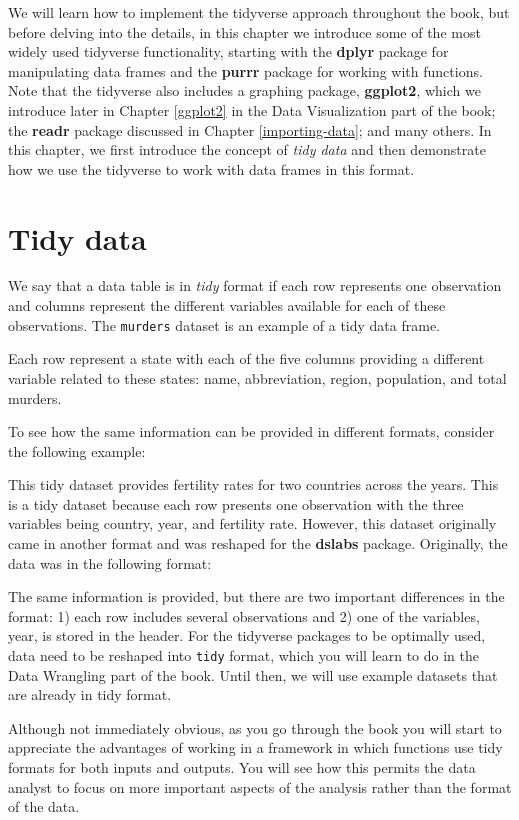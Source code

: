 \documentclass[
]{krantz}
\begin{document}
We will learn how to implement the tidyverse approach throughout the book, but before delving into the details, in this chapter we introduce some of the most widely used tidyverse functionality, starting with the \textbf{dplyr} package for manipulating data frames and the \textbf{purrr} package for working with functions. Note that the tidyverse also includes a graphing package, \textbf{ggplot2}, which we introduce later in Chapter \ref{ggplot2} in the Data Visualization part of the book; the \textbf{readr} package discussed in Chapter \ref{importing-data}; and many others. In this chapter, we first introduce the concept of \emph{tidy data} and then demonstrate how we use the tidyverse to work with data frames in this format.

\hypertarget{tidy-data}{%
\section{Tidy data}\label{tidy-data}}

We say that a data table is in \emph{tidy} format if each row represents one observation and columns represent the different variables available for each of these observations. The \texttt{murders} dataset is an example of a tidy data frame.

Each row represent a state with each of the five columns providing a different variable related to these states: name, abbreviation, region, population, and total murders.

To see how the same information can be provided in different formats, consider the following example:

This tidy dataset provides fertility rates for two countries across the years. This is a tidy dataset because each row presents one observation with the three variables being country, year, and fertility rate. However, this dataset originally came in another format and was reshaped for the \textbf{dslabs} package. Originally, the data was in the following format:

The same information is provided, but there are two important differences in the format: 1) each row includes several observations and 2) one of the variables, year, is stored in the header. For the tidyverse packages to be optimally used, data need to be reshaped into \texttt{tidy} format, which you will learn to do in the Data Wrangling part of the book. Until then, we will use example datasets that are already in tidy format.

Although not immediately obvious, as you go through the book you will start to appreciate the advantages of working in a framework in which functions use tidy formats for both inputs and outputs. You will see how this permits the data analyst to focus on more important aspects of the analysis rather than the format of the data.
\end{document}
